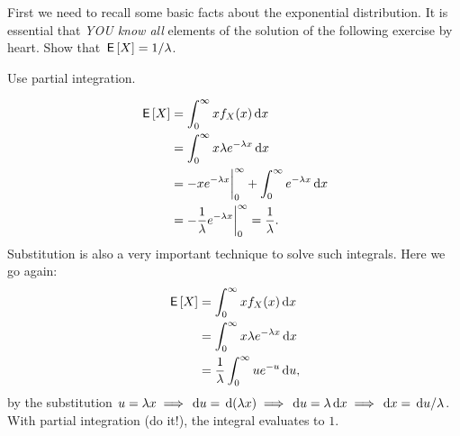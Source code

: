 \documentclass[a4paper,12pt]{article}
\begin{document}
\begin{exercise}\label{ex:4}
First we need to recall some basic facts about the exponential distribution.
It is essential that  \emph{YOU know all} elements of the solution of the following exercise by heart.
Show that $\,\mathsf{E}\left[X\right] = 1/\lambda$.
\begin{hint}
  Use partial integration.
\end{hint}
\begin{solution}
  \begin{align}
\,\mathsf{E}\left[X\right] 
&= \int_{0}^{\infty}  x f_{X}(x) \,\textrm{d}x  \\
&= \int_{0}^{\infty}  x \lambda e^{-\lambda x} \,\textrm{d}x  \\
&= - xe^{-\lambda x} \biggr|_{0}^{\infty} + \int_{0}^{\infty}  e^{-\lambda x} \,\textrm{d}x  \\
&=  - \frac 1 \lambda e^{-\lambda x} \biggr|_{0}^{\infty} = \frac 1 \lambda.
  \end{align}
Substitution is also a very important technique to solve such integrals. Here we go again:
  \begin{align}
\,\mathsf{E}\left[X\right] 
&= \int_{0}^{\infty}  x f_{X}(x) \,\textrm{d}x  \\
&= \int_{0}^{\infty}  x \lambda e^{-\lambda x} \,\textrm{d}x  \\
&= \frac 1 \lambda \int_{0}^{\infty}  u  e^{- u} \,\textrm{d}u, 
  \end{align}
  by the substitution $u=\lambda x \implies \,\textrm{d}u = \,\textrm{d}(\lambda x) \implies \,\textrm{d}u = \lambda \,\textrm{d}x \implies \,\textrm{d}x = \,\textrm{d}u / \lambda$.
  With partial integration (do it!), the integral evaluates to $1$.
\end{solution}
\end{exercise}
\end{document}
